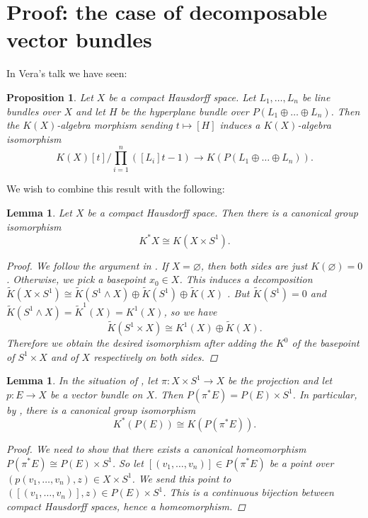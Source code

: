 \documentclass[12pt,a4paper]{amsart}
\theoremstyle{plain}
\newtheorem{lm}[thm]{Lemma}
\newtheorem{prop}[thm]{Proposition}
\theoremstyle{definition}
\theoremstyle{remark}
\begin{document}
\section{Proof: the case of decomposable vector bundles}

In Vera's talk we have seen:

\begin{prop}\label{prop:sumnongraded}
  Let $X$ be a compact Hausdorff space.
  Let $L_{1}, \ldots, L_{n}$ be line bundles over $X$ and let $H$ be the hyperplane bundle over $P(L_{1} \oplus \ldots \oplus L_{n})$.
  Then the $K(X)$-algebra morphism sending $t \mapsto [H]$ induces a $K(X)$-algebra isomorphism
  \[ K(X)[t]/\prod_{i=1}^{n}([L_{i}]t - 1) \to K(P(L_{1} \oplus \ldots \oplus L_{n})). \]
\end{prop}

We wish to combine this result with the following:

\begin{lm}\label{lm:gradedvsold}
  Let $X$ be a compact Hausdorff space.
  Then there is a canonical group isomorphism
  \[ K^{*}X \cong K(X \times S^{1}). \]
  \begin{proof}
    We follow the argument in \cite[p.~38]{wir12}.
    If $X = \varnothing$, then both sides are just $K(\varnothing) = 0$.
    Otherwise, we pick a basepoint $x_{0} \in X$.
    This induces a decomposition $\tilde{K}(X \times S^{1}) \cong \tilde{K}(S^{1} \wedge X) \oplus \tilde{K}(S^{1}) \oplus \tilde{K}(X)$ \cite[Corollary 2.4.8]{ati67}.
    But $\tilde{K}(S^{1}) = 0$ and $\tilde{K}(S^{1} \wedge X) = \tilde{K}^{1}(X) = K^{1}(X)$, so we have
    \[ \tilde{K}(S^{1} \times X) \cong K^{1}(X) \oplus \tilde{K}(X). \]
    Therefore we obtain the desired isomorphism after adding the $K^{0}$ of the basepoint of $S^{1} \times X$ and of $X$ respectively on both sides.
  \end{proof}
\end{lm}

\begin{lm}\label{lm:gradedvsoldbundle}
  In the situation of , let $\pi \colon X \times S^{1} \to X$ be the projection and let $p \colon E \to X$ be a vector bundle on $X$.
  Then $P(\pi^{*}E) = P(E) \times S^{1}$.
  In particular, by , there is a canonical group isomorphism
  \[ K^{*}(P(E)) \cong K(P(\pi^{*}E)). \]
  \begin{proof}
    We need to show that there exists a canonical homeomorphism $P(\pi^{*}E) \cong P(E) \times S^{1}$.
    So let $[(v_{1}, \ldots, v_{n})] \in P(\pi^{*}E)$ be a point over $(p(v_{1}, \ldots, v_{n}), z) \in X \times S^{1}$.
    We send this point to $([(v_{1}, \ldots, v_{n})], z) \in P(E) \times S^{1}$.
    This is a continuous bijection between compact Hausdorff spaces, hence a homeomorphism.
  \end{proof}
\end{lm}
\end{document}
